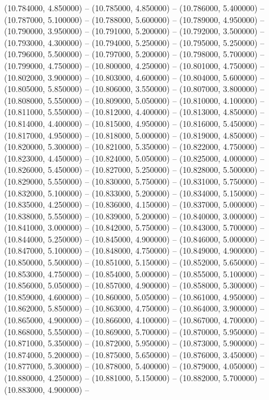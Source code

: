 (10.784000, 4.850000) -- 
(10.785000, 4.850000) -- 
(10.786000, 5.400000) -- 
(10.787000, 5.100000) -- 
(10.788000, 5.600000) -- 
(10.789000, 4.950000) -- 
(10.790000, 3.950000) -- 
(10.791000, 5.200000) -- 
(10.792000, 3.500000) -- 
(10.793000, 4.300000) -- 
(10.794000, 5.250000) -- 
(10.795000, 5.250000) -- 
(10.796000, 5.500000) -- 
(10.797000, 5.200000) -- 
(10.798000, 5.700000) -- 
(10.799000, 4.750000) -- 
(10.800000, 4.250000) -- 
(10.801000, 4.750000) -- 
(10.802000, 3.900000) -- 
(10.803000, 4.600000) -- 
(10.804000, 5.600000) -- 
(10.805000, 5.850000) -- 
(10.806000, 3.550000) -- 
(10.807000, 3.800000) -- 
(10.808000, 5.550000) -- 
(10.809000, 5.050000) -- 
(10.810000, 4.100000) -- 
(10.811000, 5.550000) -- 
(10.812000, 4.400000) -- 
(10.813000, 4.850000) -- 
(10.814000, 4.400000) -- 
(10.815000, 4.950000) -- 
(10.816000, 5.450000) -- 
(10.817000, 4.950000) -- 
(10.818000, 5.000000) -- 
(10.819000, 4.850000) -- 
(10.820000, 5.300000) -- 
(10.821000, 5.350000) -- 
(10.822000, 4.750000) -- 
(10.823000, 4.450000) -- 
(10.824000, 5.050000) -- 
(10.825000, 4.000000) -- 
(10.826000, 5.450000) -- 
(10.827000, 5.250000) -- 
(10.828000, 5.500000) -- 
(10.829000, 5.550000) -- 
(10.830000, 5.750000) -- 
(10.831000, 5.750000) -- 
(10.832000, 5.100000) -- 
(10.833000, 5.200000) -- 
(10.834000, 5.150000) -- 
(10.835000, 4.250000) -- 
(10.836000, 4.150000) -- 
(10.837000, 5.000000) -- 
(10.838000, 5.550000) -- 
(10.839000, 5.200000) -- 
(10.840000, 3.000000) -- 
(10.841000, 3.000000) -- 
(10.842000, 5.750000) -- 
(10.843000, 5.700000) -- 
(10.844000, 5.250000) -- 
(10.845000, 4.900000) -- 
(10.846000, 5.000000) -- 
(10.847000, 5.100000) -- 
(10.848000, 4.750000) -- 
(10.849000, 4.900000) -- 
(10.850000, 5.500000) -- 
(10.851000, 5.150000) -- 
(10.852000, 5.650000) -- 
(10.853000, 4.750000) -- 
(10.854000, 5.000000) -- 
(10.855000, 5.100000) -- 
(10.856000, 5.050000) -- 
(10.857000, 4.900000) -- 
(10.858000, 5.300000) -- 
(10.859000, 4.600000) -- 
(10.860000, 5.050000) -- 
(10.861000, 4.950000) -- 
(10.862000, 5.850000) -- 
(10.863000, 4.750000) -- 
(10.864000, 3.900000) -- 
(10.865000, 4.900000) -- 
(10.866000, 4.100000) -- 
(10.867000, 4.700000) -- 
(10.868000, 5.550000) -- 
(10.869000, 5.700000) -- 
(10.870000, 5.950000) -- 
(10.871000, 5.350000) -- 
(10.872000, 5.950000) -- 
(10.873000, 5.900000) -- 
(10.874000, 5.200000) -- 
(10.875000, 5.650000) -- 
(10.876000, 3.450000) -- 
(10.877000, 5.300000) -- 
(10.878000, 5.400000) -- 
(10.879000, 4.050000) -- 
(10.880000, 4.250000) -- 
(10.881000, 5.150000) -- 
(10.882000, 5.700000) -- 
(10.883000, 4.900000) -- 
